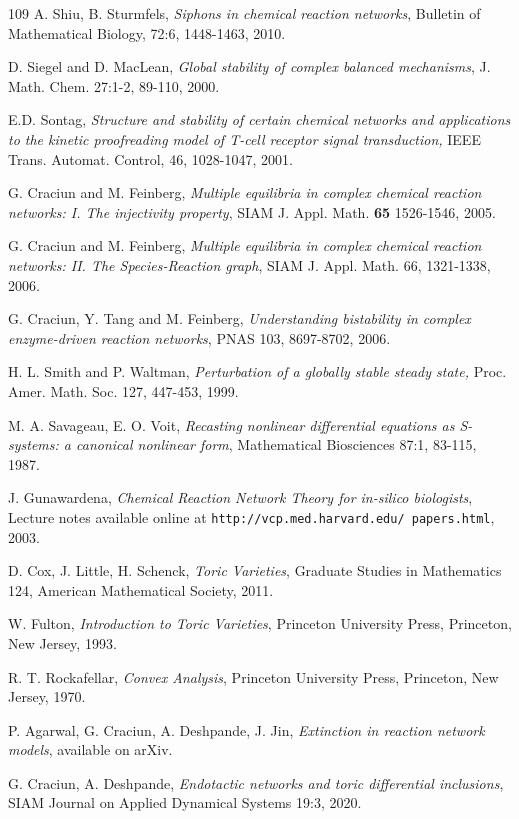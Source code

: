 \documentclass[12pt,letterpaper]{article}
\begin{document}
\begin{thebibliography}{109}
A. Shiu, B. Sturmfels,
{\em Siphons in chemical reaction networks}, 
Bulletin of Mathematical Biology, 72:6, 1448-1463, 2010.


D. Siegel and D. MacLean, 
{\em Global stability of complex balanced mechanisms}, 
J. Math. Chem. 27:1-2, 89-110, 2000.



E.D. Sontag,
{\em Structure and stability of certain chemical networks and applications to the 
kinetic proofreading model of T-cell receptor signal transduction,} 
IEEE Trans. Automat. Control, 46, 1028-1047, 2001. 





G. Craciun and M. Feinberg, 
{\em Multiple equilibria in complex chemical reaction networks: I. The injectivity property},
SIAM J. Appl. Math. \textbf{65} 1526-1546, 2005.


G. Craciun and M. Feinberg, 
{\em Multiple equilibria in complex chemical reaction networks: II. The Species-Reaction graph},
SIAM J. Appl. Math. 66, 1321-1338, 2006.



G. Craciun, Y. Tang and M.  Feinberg, {\em Understanding bistability in complex enzyme-driven reaction networks}, PNAS 103, 8697-8702, 2006.


H. L. Smith and P. Waltman, 
{\em Perturbation of a globally stable steady state,} 
Proc. Amer. Math. Soc. 127, 447-453, 1999.



M. A. Savageau, E. O. Voit,
{\em Recasting nonlinear differential equations as S-systems: a canonical nonlinear form}, Mathematical Biosciences 87:1, 83-115, 1987.

J. Gunawardena,
{\em Chemical Reaction Network Theory for in-silico biologists}, Lecture notes available online at {\tt http://vcp.med.harvard.edu/ papers.html}, 2003.

D. Cox, J. Little, H. Schenck, {\em Toric Varieties}, Graduate Studies in Mathematics 124, American Mathematical Society, 2011.

W. Fulton, {\em Introduction to Toric Varieties}, Princeton University Press, Princeton, New Jersey, 1993. 

R. T. Rockafellar, {\em Convex Analysis}, Princeton University Press, Princeton, New Jersey, 1970.

P. Agarwal, G. Craciun, A. Deshpande, J. Jin, {\em Extinction in reaction network models}, available on arXiv.


G. Craciun, A. Deshpande, {\em Endotactic networks and toric differential inclusions}, 
SIAM Journal on Applied Dynamical Systems 19:3, 2020.




\end{thebibliography}
\end{document}
